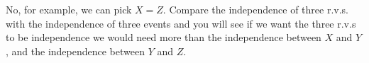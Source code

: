 
\setcounter{theorem}{40}
\begin{exercise}[BH.3.41]
    \begin{solution}
        No, for example, we can pick $X=Z$. Compare the independence of three r.v.s. with the independence of three events and you will see if we want the three r.v.s to be independence we would need more than the independence between  $X$ and $Y$, and the independence between $Y$ and $Z$.
    \end{solution}
\end{exercise}



